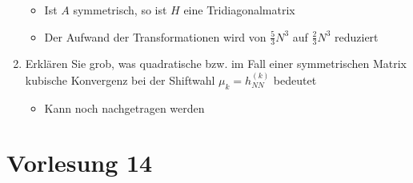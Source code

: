 \documentclass[]{article}
\begin{document}
\begin{enumerate}
			\begin{itemize}
				\item Ist $A$ symmetrisch, so ist $H$ eine Tridiagonalmatrix
				\item Der Aufwand der Transformationen wird von $\frac{5}{3}N^3$ auf $\frac{2}{3}N^3$ reduziert
			\end{itemize}
		\item Erklären Sie grob, was quadratische bzw. im Fall einer symmetrischen Matrix kubische Konvergenz bei der Shiftwahl $\mu_k = h_{NN}^{(k)}$ bedeutet
			\begin{itemize}
				\item Kann noch nachgetragen werden %
			\end{itemize}
	\end{enumerate}

\section{Vorlesung 14}
\end{document}
